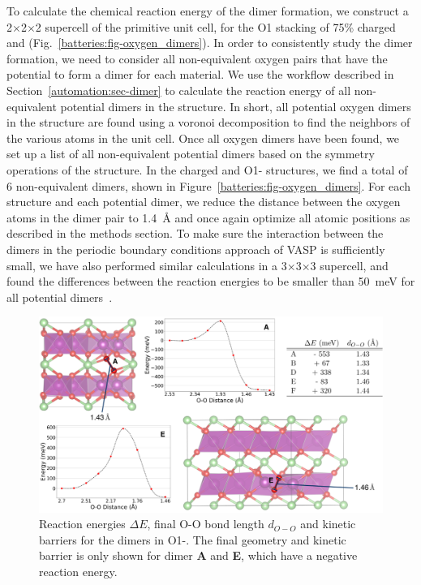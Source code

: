 \begin{refsection}
To calculate the chemical reaction energy of the dimer formation, we construct 
a 2$\times$2$\times$2 supercell of the primitive unit cell, for the O1 stacking of 75\% 
charged  and  
(Fig.~\ref{batteries:fig-oxygen_dimers}). In order to consistently study the 
dimer formation, we need to consider all non-equivalent oxygen pairs that have 
the potential to form a dimer for each material. We use the workflow described 
in Section~\ref{automation:sec-dimer} to calculate the reaction energy of all
non-equivalent potential dimers in the structure. In short, all potential oxygen dimers 
in the structure are found using a voronoi decomposition to find the neighbors 
of the various atoms in the unit cell. Once all oxygen dimers have been found, 
we set up a list of all non-equivalent potential dimers based on the
symmetry operations of the structure. In the charged 
 and O1- structures, we find a total of 6 
non-equivalent dimers, shown in Figure~\ref{batteries:fig-oxygen_dimers}. For 
each structure and each potential dimer, we reduce the distance between the 
oxygen atoms in the dimer pair to 1.4~\si{\angstrom} and once again optimize 
all atomic positions as described in the methods section. To make sure the 
interaction between the dimers in the periodic boundary conditions approach of 
VASP is sufficiently small, we have also performed similar calculations in a 
3$\times$3$\times$3 supercell, and found the differences between the reaction energies to be 
smaller than 50~\si{\milli\electronvolt} for all potential 
dimers~\cite{Levi2020}. 
 
\begin{figure}[ht] 
\centering
\captionsetup{width=0.9\linewidth}
\includegraphics[width=\textwidth]{Figures/batteries/dimer_energetics.png} 
\caption{Reaction energies $\Delta E$, final O-O bond length $d_{O-O}$ and 
kinetic barriers for the dimers in O1-. The final geometry 
and kinetic barrier is only shown for dimer \textbf{A} and \textbf{E}, which 
have a negative reaction energy.} 
\label{batteries:fig-Mn_dimers} 
\end{figure} 
 

\end{refsection}
